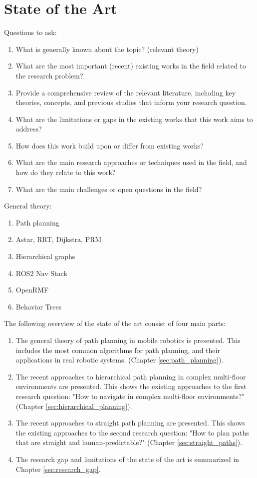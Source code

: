 \chapter{State of the Art}
\label{sec:state_of_the_art}
Questions to ask:
\begin{enumerate}
    \item What is generally known about the topic? (relevant theory)
    \item What are the most important (recent) existing works in the field related to the research problem? 
    \item Provide a comprehensive review of the relevant literature, including key theories, concepts, and previous studies that inform your research question.
    \item What are the limitations or gaps in the existing works that this work aims to address? 
    \item How does this work build upon or differ from existing works? 
    \item What are the main research approaches or techniques used in the field, and how do they relate to this work? 
    \item What are the main challenges or open questions in the field? 
\end{enumerate}

General theory:
\begin{enumerate}
    \item Path planning
    \item Astar, RRT, Dijkstra, PRM
    \item Hierarchical graphs
    \item ROS2 Nav Stack
    \item OpenRMF
    \item Behavior Trees
\end{enumerate}

The following overview of the state of the art consist of four main parts:
\begin{enumerate}
    \item The general theory of path planning in mobile robotics is presented. This includes the most common algorithms for path planning, and their applications in real robotic systems. (Chapter \ref{sec:path_planning}).
    \item The recent approaches to hierarchical path planning in complex multi-floor environments are presented. This shows the existing approaches to the first research question: "How to navigate in complex multi-floor environments?" (Chapter \ref{sec:hierarchical_planning}).
    \item The recent approaches to straight path planning are presented. This shows the existing approaches to the second research question: "How to plan paths that are straight and human-predictable?" (Chapter \ref{sec:straight_paths}).
    \item The research gap and limitations of the state of the art is summarized in Chapter \ref{sec:research_gap}.
\end{enumerate}

